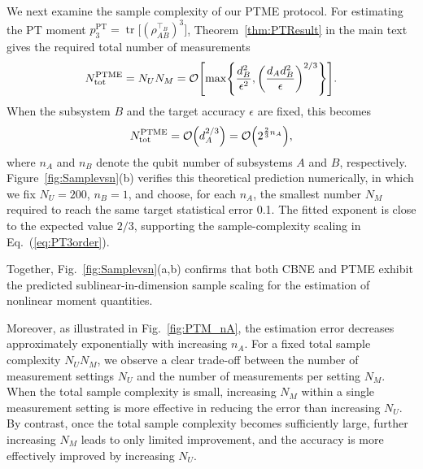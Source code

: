 \documentclass[aps,prl,twocolumn,nofootinbib,superscriptaddress,10pt]{revtex4-2}
\let\originalleft\left
\let\originalright\right
\renewcommand{\left}{\mathopen{}\mathclose\bgroup\originalleft}
\renewcommand{\right}{\aftergroup\egroup\originalright}
\DeclareMathOperator{\Tr}{tr}
\newcommand{\bigo}[1]{\mathcal{O}\left(#1\right)}
\theoremstyle{plain}
\theoremstyle{definition}
\newcommand{\PT}{\mathrm{PT}}
\newcommand{\eref}[1]{Eq.~\textup{(\ref{#1})}}
\newcommand{\tref}[1]{Theorem~\ref{#1}}
\begin{document}
We next examine the sample complexity of our PTME protocol. 
For estimating the PT moment \(p_3^{\PT}=\Tr\!\big[(\rho_{AB}^{\top_{\! B}})^3\big]\), \tref{thm:PTResult} in the main text gives the required total number of measurements
\begin{equation}
N_{\mathrm{tot}}^{\mathrm{PTME}}
=
N_U N_M
=
\mathcal O\left[
\max\left\{
\frac{d_B^2}{\epsilon^2},
\left(\frac{d_A d_B^2}{\epsilon}\right)^{2/3}
\right\}
\right].
\label{eq:PTME_sample_complexity_num}
\end{equation}
When the subsystem \(B\) and the target accuracy \(\epsilon\) are fixed, this becomes
\begin{equation}\label{eq:PT3order}
N_{\mathrm{tot}}^{\mathrm{PTME}}
=
\bigo{d_A^{2/3}}=\bigo{2^{\frac23 n_A}}, 
\end{equation}
where $n_A$ and $n_B$ denote the qubit number of subsystems $A$ and $B$, respectively. 
Figure~\ref{fig:Samplevsn}(b) verifies this theoretical prediction numerically, in which we fix \(N_U=200\), $n_B=1$, and choose, for each \(n_A\), the smallest number \(N_M\) required to reach the same target statistical error 0.1. 
The fitted exponent is close to the expected value \(2/3\), supporting the sample-complexity scaling in \eref{eq:PT3order}. 

Together, Fig.~\ref{fig:Samplevsn}(a,b) confirms that both CBNE and PTME exhibit the predicted sublinear-in-dimension sample scaling for the estimation of nonlinear moment quantities.



Moreover, as illustrated in Fig.~\ref{fig:PTM_nA}, the estimation error decreases approximately exponentially with increasing $n_A$. For a fixed total sample complexity $N_UN_M$, we observe a clear trade-off between the number of measurement settings $N_U$ and the number of measurements per setting $N_M$. When the total sample complexity is small, increasing $N_M$ within a single measurement setting is more effective in reducing the error than increasing $N_U$.
By contrast, once the total sample complexity becomes sufficiently large, further increasing $N_M$ leads to only limited improvement, and the accuracy is more effectively improved by increasing $N_U$.
\end{document}
